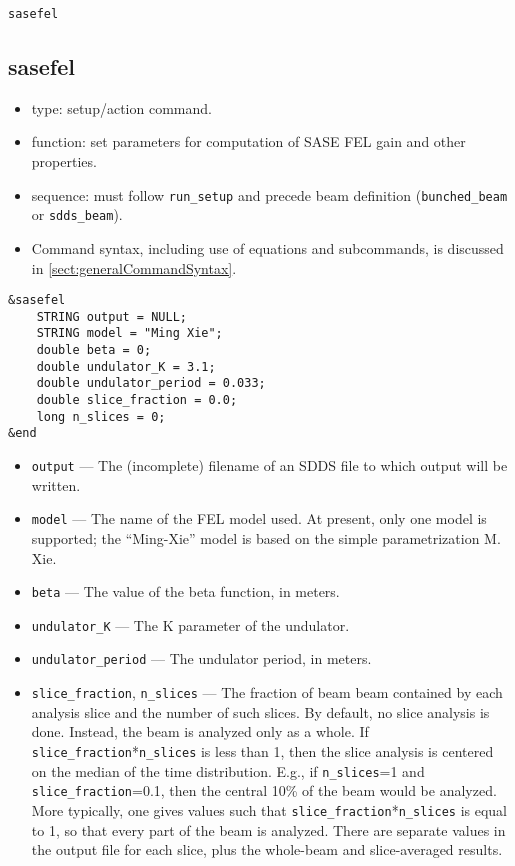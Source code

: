 \documentclass[11pt]{article}
\begin{document}
\newpage
\begin{center}{\Large\verb|sasefel|}\end{center}
\subsection{sasefel \label{subsec:sasefel}}

\begin{itemize}
\item type: setup/action command.
\item function: set parameters for computation of SASE FEL gain and other properties.
\item sequence: must follow \verb|run_setup| and precede beam definition (\verb|bunched_beam| or \verb|sdds_beam|).
\item Command syntax, including use of equations and subcommands, is discussed in \ref{sect:generalCommandSyntax}.
\end{itemize}

\begin{verbatim}
&sasefel
    STRING output = NULL;
    STRING model = "Ming Xie";
    double beta = 0;
    double undulator_K = 3.1;
    double undulator_period = 0.033;
    double slice_fraction = 0.0;
    long n_slices = 0;
&end
\end{verbatim}

\begin{itemize}
\item \verb|output| --- The (incomplete) filename of an SDDS file to which output will be
written.
\item \verb|model| --- The name of the FEL model used.  At present, only one model is
supported; the ``Ming-Xie'' model is based on the simple parametrization M. Xie\cite{MingXie}.
\item \verb|beta| --- The value of the beta function, in meters.
\item \verb|undulator_K| --- The K parameter of the undulator.
\item \verb|undulator_period| --- The undulator period, in meters.
\item \verb|slice_fraction|, \verb|n_slices| --- The fraction of beam beam contained by each analysis slice
        and the number of such slices.
        By default, no slice analysis is done.  Instead, the beam is analyzed only as a whole.
        If \verb|slice_fraction|*\verb|n_slices| is less than 1, then the slice analysis
        is centered on the median of the time distribution.  E.g., if \verb|n_slices|=1 and
        \verb|slice_fraction|=0.1, then the central 10\% of the beam would be analyzed.
        More typically, one gives values such that \verb|slice_fraction|*\verb|n_slices| is
        equal to 1, so that every part of the beam is analyzed.  There are separate values in
        the output file for each slice, plus the whole-beam and slice-averaged results.
\end{itemize}
\end{document}
